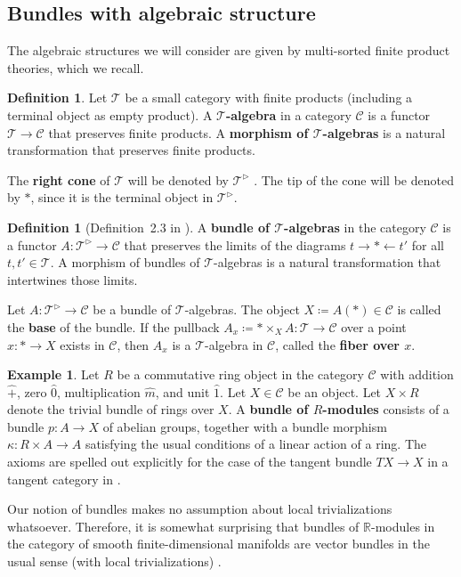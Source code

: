\documentclass[12pt,reqno, a4paper]{amsart}
\numberwithin{equation}{section}
\theoremstyle{plain}
\theoremstyle{definition}
\newtheorem{Definition}[Theorem]{Definition}
\newtheorem{Example}[Theorem]{Example}
\theoremstyle{remark}
\newcommand{\bbR}{\mathbb{R}}
\newcommand{\calC}{\mathcal{C}}
\newcommand{\calT}{\mathcal{T}}
\newcommand{\calTcone}{\mathcal{T}^\triangleright}
\newcommand{\Rmult}{\hat{m}}
\newcommand{\Radd}{\hat{+}}
\newcommand{\Runit}{\hat{1}}
\newcommand{\Rzero}{\hat{0}}
\begin{document}
\subsection{Bundles with algebraic structure}
\label{sec:BunAbelGp}

The algebraic structures we will consider are given by multi-sorted finite product theories, which we recall.

\begin{Definition}
\label{def:TAlg}
Let $\calT$ be a small category with finite products (including a terminal object as empty product). A \textbf{$\calT$-algebra} in a category $\calC$ is a functor $\calT \to \calC$ that preserves finite products. A \textbf{morphism of $\calT$-algebras} is a natural transformation that preserves finite products.
\end{Definition}


The \textbf{right cone} of $\calT$ will be denoted by $\calTcone$ \cite[Notation~1.2.8.4]{Lurie:2009}. The tip of the cone will be denoted by $*$, since it is the terminal object in $\calTcone$.

\begin{Definition}[Definition~2.3 in \cite{AintablianBlohmann:2026}]
\label{def:BundleOfTAlgs}
A \textbf{bundle of $\calT$-algebras} in the category $\calC$ is a functor $A: \calTcone \to \calC$ that preserves the limits of the diagrams $t \to * \leftarrow t'$ for all $t, t' \in \calT$. A morphism of bundles of $\calT$-algebras is a natural transformation that intertwines those limits.
\end{Definition}

Let $A: \calTcone \to \calC$ be a bundle of $\calT$-algebras. The object $X \coloneqq A(*) \in \calC$ is called the \textbf{base} of the bundle. If the pullback $A_x \coloneqq * \times_X A: \calT \to \calC$ over a point $x: * \to X$ exists in $\calC$, then $A_x$ is a $\calT$-algebra in $\calC$, called the \textbf{fiber over $x$}.

\begin{Example}
Let $R$ be a commutative ring object in the category $\calC$ with addition $\Radd$, zero $\Rzero$, multiplication $\Rmult$, and unit $\Runit$. Let $X \in \calC$ be an object. Let $X \times R$ denote the trivial bundle of rings over $X$. A \textbf{bundle of $R$-modules} consists of a bundle $p: A \to X$ of abelian groups, together with a bundle morphism $\kappa: R \times A \to A$ satisfying the usual conditions of a linear action of a ring. The axioms are spelled out explicitly for the case of the tangent bundle $TX \to X$ in a tangent category in \cite[Prop.~4.1]{AintablianBlohmann:2026}.

Our notion of bundles makes no assumption about local trivializations whatsoever. Therefore, it is somewhat surprising that bundles of $\bbR$-modules in the category of smooth finite-dimensional manifolds are vector bundles in the usual sense (with local trivializations) \cite[Example~2.7]{AintablianBlohmann:2025}.
\end{Example}
\end{document}
